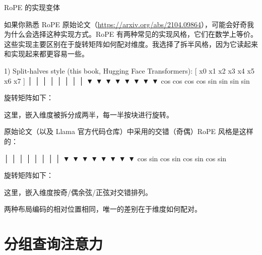 \begin{mySidebar}{RoPE 的实现变体}

如果你熟悉 RoPE 原始论文（\href{https://arxiv.org/abs/2104.09864}{https://arxiv.org/abs/2104.09864}），可能会好奇我为什么会选择这种实现方式。RoPE 有两种常见的实现风格，它们在数学上等价。这些实现主要区别在于旋转矩阵如何配对维度。我选择了拆半风格，因为它读起来和实现起来都更容易一些。

\begin{codebox}
1) Split-halves style (this book, Hugging Face Transformers):
      [ x0   x1   x2   x3   x4   x5   x6   x7 ]
        │    │    │    │    │    │    │    │
        ▼    ▼    ▼    ▼    ▼    ▼    ▼    ▼
       cos  cos  cos  cos  sin  sin  sin  sin
\end{codebox}

旋转矩阵如下：

\begin{codebox}
\end{codebox}

这里，嵌入维度被拆分成两半，每一半按块进行旋转。

原始论文（以及 Llama 官方代码仓库）中采用的交错（奇偶）RoPE 风格是这样的：

\begin{codebox}
      [ x0   x1   x2   x3   x4   x5   x6   x7 ]
        │    │    │    │    │    │    │    │
        ▼    ▼    ▼    ▼    ▼    ▼    ▼    ▼
       cos  sin  cos  sin  cos  sin  cos  sin
\end{codebox}

旋转矩阵如下：

\begin{codebox}
\end{codebox}

这里，嵌入维度按奇/偶余弦/正弦对交错排列。

两种布局编码的相对位置相同，唯一的差别在于维度如何配对。

\end{mySidebar}

\section{分组查询注意力}

